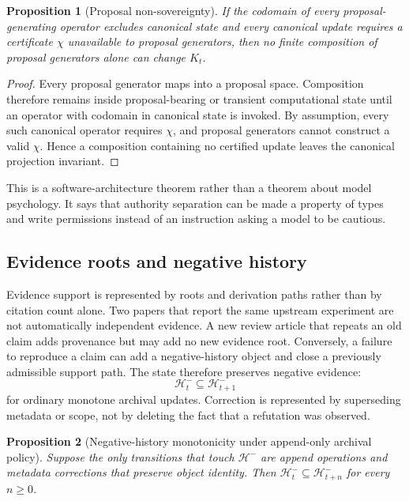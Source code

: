\documentclass[11pt]{article}
\newtheorem{proposition}{Proposition}
\begin{document}
\begin{proposition}[Proposal non-sovereignty]
If the codomain of every proposal-generating operator excludes canonical state and every canonical update requires a certificate \(\chi\) unavailable to proposal generators, then no finite composition of proposal generators alone can change \(K_t\).
\end{proposition}

\begin{proof}
Every proposal generator maps into a proposal space. Composition therefore remains inside proposal-bearing or transient computational state until an operator with codomain in canonical state is invoked. By assumption, every such canonical operator requires \(\chi\), and proposal generators cannot construct a valid \(\chi\). Hence a composition containing no certified update leaves the canonical projection invariant.
\end{proof}

This is a software-architecture theorem rather than a theorem about model psychology. It says that authority separation can be made a property of types and write permissions instead of an instruction asking a model to be cautious.

\subsection{Evidence roots and negative history}

Evidence support is represented by roots and derivation paths rather than by citation count alone. Two papers that report the same upstream experiment are not automatically independent evidence. A new review article that repeats an old claim adds provenance but may add no new evidence root. Conversely, a failure to reproduce a claim can add a negative-history object and close a previously admissible support path. The state therefore preserves negative evidence:
\[
\mathcal H_t^{-}\subseteq \mathcal H_{t+1}^{-}
\]
for ordinary monotone archival updates. Correction is represented by superseding metadata or scope, not by deleting the fact that a refutation was observed.

\begin{proposition}[Negative-history monotonicity under append-only archival policy]
Suppose the only transitions that touch \(\mathcal H^{-}\) are append operations and metadata corrections that preserve object identity. Then \(\mathcal H_t^{-}\subseteq\mathcal H_{t+n}^{-}\) for every \(n\ge 0\).
\end{proposition}
\end{document}
